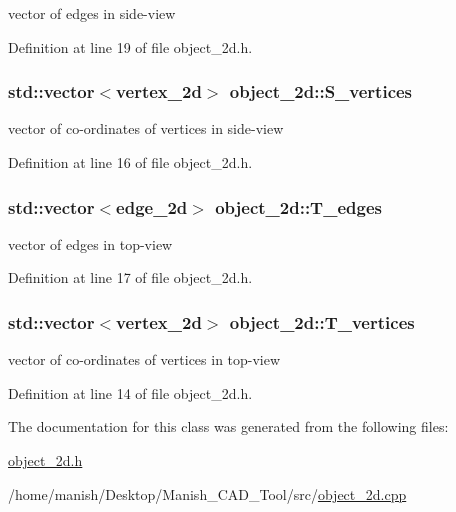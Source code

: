 vector of edges in side-\/view 



Definition at line 19 of file object\+\_\+2d.\+h.

\subsubsection[{\texorpdfstring{S\+\_\+vertices}{S_vertices}}]{\setlength{\rightskip}{0pt plus 5cm}std\+::vector$<${\bf vertex\+\_\+2d}$>$ object\+\_\+2d\+::\+S\+\_\+vertices}\hypertarget{classobject__2d_a722b0505e408b8864809a7ae55c86df4}{}\label{classobject__2d_a722b0505e408b8864809a7ae55c86df4}


vector of co-\/ordinates of vertices in side-\/view 



Definition at line 16 of file object\+\_\+2d.\+h.

\subsubsection[{\texorpdfstring{T\+\_\+edges}{T_edges}}]{\setlength{\rightskip}{0pt plus 5cm}std\+::vector$<${\bf edge\+\_\+2d}$>$ object\+\_\+2d\+::\+T\+\_\+edges}\hypertarget{classobject__2d_a1543063eb017187a7582821d1ec07faf}{}\label{classobject__2d_a1543063eb017187a7582821d1ec07faf}


vector of edges in top-\/view 



Definition at line 17 of file object\+\_\+2d.\+h.

\subsubsection[{\texorpdfstring{T\+\_\+vertices}{T_vertices}}]{\setlength{\rightskip}{0pt plus 5cm}std\+::vector$<${\bf vertex\+\_\+2d}$>$ object\+\_\+2d\+::\+T\+\_\+vertices}\hypertarget{classobject__2d_aedcad81ef4cdb308ffade7bcf7de4cc2}{}\label{classobject__2d_aedcad81ef4cdb308ffade7bcf7de4cc2}


vector of co-\/ordinates of vertices in top-\/view 



Definition at line 14 of file object\+\_\+2d.\+h.



The documentation for this class was generated from the following files\+:\begin{DoxyCompactItemize}
\item 
\hyperlink{object__2d_8h}{object\+\_\+2d.\+h}\item 
/home/manish/\+Desktop/\+Manish\+\_\+\+C\+A\+D\+\_\+\+Tool/src/\hyperlink{object__2d_8cpp}{object\+\_\+2d.\+cpp}\end{DoxyCompactItemize}
